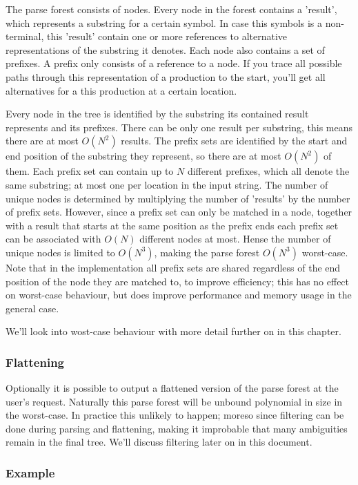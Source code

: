 \documentclass[a4paper,10pt]{article}
\begin{document}
The parse forest consists of nodes. Every node in the forest contains a 'result', which represents a substring for a certain symbol. In case this symbols is a non-terminal, this 'result' contain one or more references to alternative representations of the substring it denotes. Each node also contains a set of prefixes. A prefix only consists of a reference to a node. If you trace all possible paths through this representation of a production to the start, you'll get all alternatives for a this production at a certain location.

Every node in the tree is identified by the substring its contained result represents and its prefixes. There can be only one result per substring, this means there are at most $O(N^2)$ results. The prefix sets are identified by the start and end position of the substring they represent, so there are at most $O(N^2)$ of them. Each prefix set can contain up to $N$ different prefixes, which all denote the same substring; at most one per location in the input string. The number of unique nodes is determined by multiplying the number of 'results' by the number of prefix sets. However, since a prefix set can only be matched in a node, together with a result that starts at the same position as the prefix ends each prefix set can be associated with $O(N)$ different nodes at most. Hense the number of unique nodes is limited to $O(N^3)$, making the parse forest $O(N^3)$ worst-case. Note that in the implementation all prefix sets are shared regardless of the end position of the node they are matched to, to improve efficiency; this has no effect on worst-case behaviour, but does improve performance and memory usage in the general case.

We'll look into wost-case behaviour with more detail further on in this chapter.

\subsubsection{Flattening}

Optionally it is possible to output a flattened version of the parse forest at the user's request. Naturally this parse forest will be unbound polynomial in size in the worst-case. In practice this unlikely to happen; moreso since filtering can be done during parsing and flattening, making it improbable that many ambiguities remain in the final tree. We'll discuss filtering later on in this document.

\subsubsection{Example}
\end{document}
